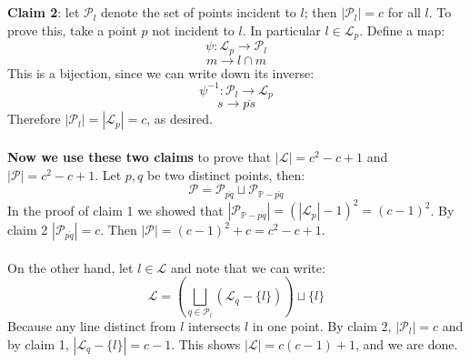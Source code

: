 \documentclass[12 pt]{article}
\begin{document}
\\
\\
\textbf{Claim 2}: let $\mathcal{P}_l$ denote the set of points incident to $l$; then $|\mathcal{P}_l| = c$ for all $l$. To prove this, take a point $p$ not incident to $l$. In particular $l\in \mathcal{L}_p$. Define a map:
\[    \psi : \mathcal{L}_p \to \mathcal{P}_l     \]
\[    m \to l\cap m       \]
This is a bijection, since we can write down its inverse:
\[       \psi^{-1} : \mathcal{P}_l \to \mathcal{L}_p  \]
\[     s \to \overline{ps}     \]
Therefore $| \mathcal{P}_l  | = |\mathcal{L}_p| = c$, as desired.
\\
\\
\textbf{Now we use these two claims} to prove that $|\mathcal{L}| = c^2 - c + 1$ and $ |\mathcal{P}| = c^2 - c +1$. Let $p,q$ be two distinct points, then:
\[       \mathcal{P} = \mathcal{P}_{\overline{pq}} \sqcup \mathcal{P}_{\mathbb{P}-\overline{pq}}       \]
In the proof of claim 1 we showed that $|\mathcal{P}_{\mathbb{P}-\overline{pq}}| = (|\mathcal{L}_p|-1)^2 = (c-1)^2$. By claim 2 $|\mathcal{P}_{\overline{pq}}| = c$. Then $ |\mathcal{P}| = (c-1)^2 + c = c^2 - c +1$.
\\
\\
On the other hand, let $l\in \mathcal{L}$ and note that we can write:
\[         \mathcal{L} = \left( \bigsqcup_{q\in \mathcal{P}_l} (\mathcal{L}_q - \{l\}) \right) \sqcup \{l\}          \]
Because any line distinct from $l$ intersects $l$ in one point. By claim 2, $|\mathcal{P}_l| = c$ and by claim 1, $|\mathcal{L}_q - \{l\} | = c-1$. This shows $|\mathcal{L}| = c(c-1) + 1$, and we are done.
\end{document}
